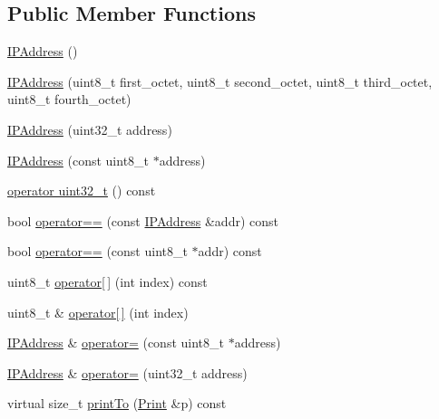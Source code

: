 \subsection*{Public Member Functions}
\begin{DoxyCompactItemize}
\item 
\hyperlink{class_i_p_address_a0bfb87befbd8b4cf9ebf348c10a9eaa9}{I\+P\+Address} ()
\item 
\hyperlink{class_i_p_address_a00b68db2117680a85111da0791c0479d}{I\+P\+Address} (uint8\+\_\+t first\+\_\+octet, uint8\+\_\+t second\+\_\+octet, uint8\+\_\+t third\+\_\+octet, uint8\+\_\+t fourth\+\_\+octet)
\item 
\hyperlink{class_i_p_address_a245b8f4f95796da669d51b400ae2b896}{I\+P\+Address} (uint32\+\_\+t address)
\item 
\hyperlink{class_i_p_address_a445de5f4af39b98bf10e8d77832cfe5f}{I\+P\+Address} (const uint8\+\_\+t $\ast$address)
\item 
\hyperlink{class_i_p_address_a07a970954bca44bc378188d2a6332f74}{operator uint32\+\_\+t} () const 
\item 
bool \hyperlink{class_i_p_address_ad0181169c1fa057bf9ef7862ba9f7f84}{operator==} (const \hyperlink{class_i_p_address}{I\+P\+Address} \&addr) const 
\item 
bool \hyperlink{class_i_p_address_a7d473ee4ece3f484491e56ce09096571}{operator==} (const uint8\+\_\+t $\ast$addr) const 
\item 
uint8\+\_\+t \hyperlink{class_i_p_address_a3a30e06242fc12a5aed67bfd77d1b2a5}{operator\mbox{[}$\,$\mbox{]}} (int index) const 
\item 
uint8\+\_\+t \& \hyperlink{class_i_p_address_a362f02e2923dd74e0fc935eab183429d}{operator\mbox{[}$\,$\mbox{]}} (int index)
\item 
\hyperlink{class_i_p_address}{I\+P\+Address} \& \hyperlink{class_i_p_address_ae51d1758e3e7bfdb947bef318c300e7c}{operator=} (const uint8\+\_\+t $\ast$address)
\item 
\hyperlink{class_i_p_address}{I\+P\+Address} \& \hyperlink{class_i_p_address_a1485e06a1694bc174704c61e0d44e52f}{operator=} (uint32\+\_\+t address)
\item 
virtual size\+\_\+t \hyperlink{class_i_p_address_a4de4b3920775530f38f756b2177a9bca}{print\+To} (\hyperlink{class_print}{Print} \&p) const 
\end{DoxyCompactItemize}
